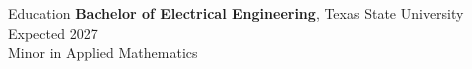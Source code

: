 \documentclass{resume} %
\begin{document}

\begin{rSection}{Education}
{\bf Bachelor of Electrical Engineering}, Texas State University \hfill {Expected 2027}\\
Minor in Applied Mathematics

\end{rSection}
\end{document}
